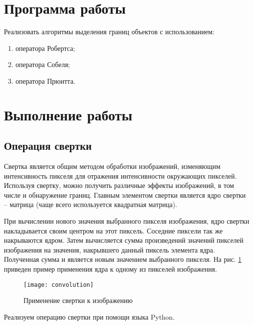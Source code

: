 





\tableofcontents
\newpage

\section{Программа работы}

Реализовать алгоритмы выделения границ объектов с использованием:

\begin{enumerate}
	\item оператора Робертса;
	\item оператора Собеля;
	\item оператора Прюитта.
\end{enumerate}

\section{Выполнение работы}

\subsection{Операция свертки}

Свертка является общим методом обработки изображений, изменяющим интенсивность пикселя для отражения интенсивности окружающих пикселей. Используя свертку, можно получить различные эффекты изображений, в том числе и обнаружение границ. Главным элементом свертки является ядро свертки -- матрица (чаще всего используется квадратная матрица).

При вычислении нового значения выбранного пикселя изображения, ядро свертки накладывается своим центром на этот пиксель. Соседние пиксели так же накрываются ядром. Затем вычисляется сумма произведений значений пикселей изображения на значения, накрывшего данный пиксель элемента ядра. Полученная сумма и является новым значением выбранного пикселя. На рис. \ref{fig:convolution} приведен пример применения ядра к одному из пикселей изображения.

\begin{figure}[H]
	\centering
	\texttt{[image: convolution]}
	\caption{Применение свертки к изображению}
	\label{fig:convolution}
\end{figure}

\newpage

Реализуем операцию свертки при помощи языка Python.

